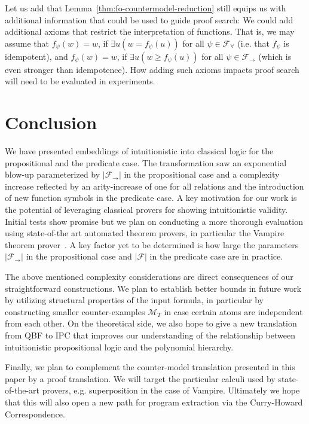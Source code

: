 \documentclass[runningheads]{llncs}
\begin{document}
Let us add that Lemma~\ref{thm:fo-countermodel-reduction} still equips us with additional information that could be used to guide proof search: We could add additional axioms that restrict the interpretation of functions. That is, we may assume that $f_\psi(w) = w$, if $\exists u(w = f_\psi(u))$ for all $\psi\in\mathcal F_\forall$ (i.e. that $f_\psi$ is idempotent), and $f_\psi(w) = w$, if $\exists u(w \geq f_\psi(u))$ for all $\psi\in\mathcal F_\to$ (which is even stronger than idempotence).
How adding such axioms impacts proof search will need to be evaluated in experiments.

\section{Conclusion}

We have presented embeddings of intuitionistic into classical logic for the propositional and the predicate case.
The transformation saw an exponential blow-up parameterized by $|\mathcal F_\to|$ in the propositional case and a complexity increase reflected by an arity-increase of one for all relations and the introduction of new function symbols in the predicate case.
A key motivation for our work is the potential of leveraging classical provers for showing intuitionistic validity.
Initial tests show promise but we plan on conducting a more thorough evaluation using state-of-the art automated theorem provers, in particular the Vampire theorem prover~\cite{kovacs2013first}.
A key factor yet to be determined is how large the parameters $|\mathcal F_\to|$ in the propositional case and $|\mathcal F|$ in the predicate case are in practice.

The above mentioned complexity considerations are direct consequences of our straightforward constructions.
We plan to establish better bounds in future work by utilizing structural properties of the input formula, in particular by constructing smaller counter-examples $\mathcal M_T$ in case certain atoms are independent from each other.
On the theoretical side, we also hope to give a new translation from QBF to IPC that improves our understanding of the relationship between intuitionistic propositional logic and the polynomial hierarchy.

Finally, we plan to complement the counter-model translation presented in this paper by a proof translation.
We will target the particular calculi used by state-of-the-art provers, e.g. superposition in the case of Vampire. Ultimately we hope that this will also open a new path for program extraction via the Curry-Howard Correspondence.
\end{document}
